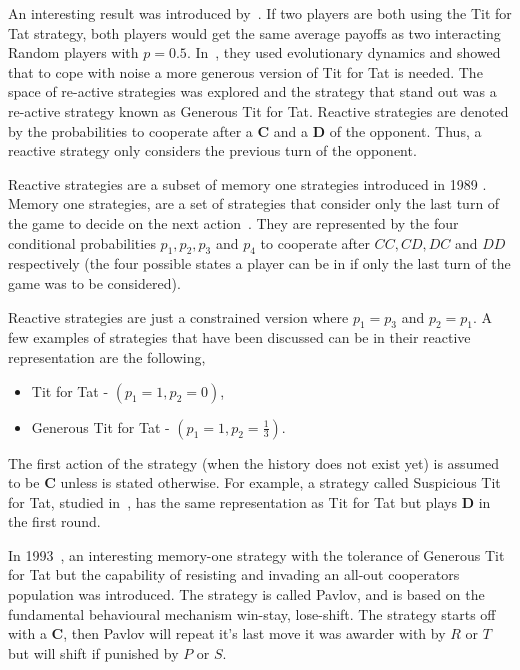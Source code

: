 \documentclass{article}
\begin{document}
An interesting result was introduced by~\cite{Molander1985}.  If two players are
both using the Tit for Tat strategy, both players would get the same average
payoffs as two interacting Random players with \(p=0.5\). 
In~\cite{Nowak1992}, they used evolutionary dynamics and showed that to cope
with noise a more generous version of Tit for Tat is needed. 
The space of re-active strategies was explored and the strategy that stand out 
was a re-active strategy known as Generous Tit for Tat. 
Reactive strategies are denoted by the probabilities to cooperate after a
\textbf{C} and a \textbf{D} of the opponent. Thus, a reactive strategy
only considers the previous turn of the opponent. 

Reactive strategies are a subset of memory one strategies introduced in 1989
\cite{nowak1989}. Memory one strategies, are a set of strategies that 
consider only the last turn of the game to decide on the next action~\cite{Nowak1990}.
They are represented by the four conditional probabilities \(p_1, p_2, p_3\) and
\(p_4\) to cooperate after \(CC, CD, DC\) and \(DD\) respectively
(the four possible states a player can be in if only the last turn of the game was
to be considered).  

Reactive strategies are just a constrained version where \(p_1=p_3\) and
\(p_2=p_1\). A few examples of strategies that have been discussed can be 
in their reactive representation are the following,

\begin{itemize}
	\item Tit for Tat - \((p_1=1, p_2=0)\),
	\item Generous Tit for Tat - \((p_1=1, p_2=\frac{1}{3})\).
\end{itemize}

The first action of the strategy (when the history does not exist yet) is assumed
to be \textbf{C} unless is stated otherwise. For example, a strategy called
Suspicious Tit for Tat, studied in~\cite{Nowak1992}, has the same representation
as Tit for Tat but plays \textbf{D} in the first round.

In 1993~\cite{Nowak1993}, an interesting memory-one  strategy with the 
tolerance of Generous Tit for Tat but the capability of resisting and invading
an all-out cooperators population was introduced. The strategy is called Pavlov,
and is based on the fundamental behavioural mechanism win-stay, lose-shift.
The strategy starts off with a \textbf{C}, then Pavlov will repeat it's last 
move it was awarder with by \(R\) or \(T\) but will shift if punished by \(P\) or \(S\).
\end{document}
